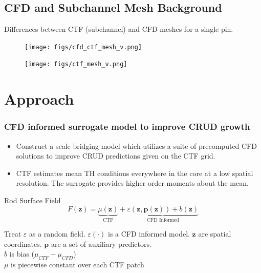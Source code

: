 \documentclass[t, pdftex]{beamer}
\begin{document}
\subsection*{CFD and Subchannel Mesh Background}
\begin{frame}
Differences between CTF (subchannel) and CFD meshes for a single pin.
\begin{figure}
        \centering
        \begin{minipage}{.4\textwidth}
            \centering
            \texttt{[image: figs/cfd\_ctf\_mesh\_v.png]}
        \end{minipage}%
        \begin{minipage}{.4\textwidth}
            \centering
            \texttt{[image: figs/ctf\_mesh\_v.png]}
        \end{minipage}
\end{figure}
\end{frame}

\section{Approach}
\begin{frame}
    \frametitle{CFD informed surrogate model to improve CRUD growth}
    \begin{itemize}
    \item Construct a scale bridging model which utilizes a suite of precomputed CFD solutions to improve CRUD predictions given on the CTF grid. 
    \item CTF estimates mean TH conditions everywhere in the core at a low spatial resolution.  The surrogate provides higher order moments about the mean.
    \end{itemize}
    \begin{block}{Rod Surface Field}
        \[ 
        F(\mathbf z) = \underbrace{\mu(\mathbf{z})}_\text{CTF} + \underbrace{\varepsilon(\mathbf z, {\mathbf p(\mathbf z)}) + b(\mathbf{z}) }_\text{CFD Informed}
        \]
    \end{block}
    Treat $\varepsilon$ as a random field.  $\varepsilon(\cdot)$ is a CFD informed model. $\mathbf z$ are spatial coordinates. $\mathbf p$ are a set of auxiliary predictors. \\
    $b$ is bias ($\mu_{CTF} - \mu_{CFD}$) \\
    $\mu$ is piecewise constant over each CTF patch
\end{frame}
\end{document}
